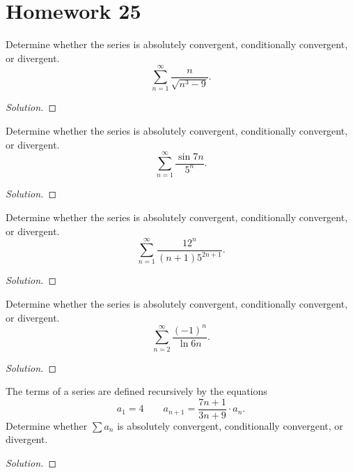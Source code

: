 \section*{Homework 25}
\begin{problem}[WebAssign HW 25, \# 1]
Determine whether the series is absolutely convergent, conditionally
convergent, or divergent.
\[
\sum_{n=1}^\infty\frac{n}{\sqrt{n^3-9}}.
\]
\end{problem}
\begin{proof}[Solution]
\end{proof}
\begin{problem}[WebAssign HW 25, \# 2]
Determine whether the series is absolutely convergent, conditionally
convergent, or divergent.
\[
\sum_{n=1}^\infty\frac{\sin 7n}{5^n}.
\]
\end{problem}
\begin{proof}[Solution]
\end{proof}
\begin{problem}[WebAssign HW 25, \# 3]
Determine whether the series is absolutely convergent, conditionally
convergent, or divergent.
\[
\sum_{n=1}^\infty\frac{12^n}{(n+1) 5^{2n+1}}.
\]
\end{problem}
\begin{proof}[Solution]
\end{proof}
\begin{problem}[WebAssign HW 25, \# 4]
Determine whether the series is absolutely convergent, conditionally
convergent, or divergent.
\[
\sum_{n=2}^\infty\frac{(-1)^n}{\ln 6n}.
\]
\end{problem}
\begin{proof}[Solution]
\end{proof}
\begin{problem}[WebAssign HW 25, \# 5]
The terms of a series are defined recursively by the equations
\[
a_1=4\qquad a_{n+1}=\frac{7n+1}{3n+9}\cdot a_n.
\]
Determine whether $\sum a_n$ is absolutely convergent, conditionally
convergent, or divergent.
\end{problem}
\begin{proof}[Solution]
\end{proof}

